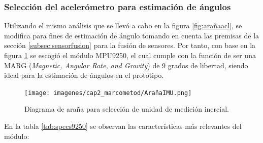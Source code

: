 \subsubsection{Selección del acelerómetro para estimación de ángulos}

Utilizando el mismo análisis que se llevó a cabo en la figura \ref{fig:arañaacl}, se modifica para fines de estimación de ángulo tomando en cuenta las premisas de la sección \ref{subsec:sensorfusion} para la fusión de sensores. Por tanto, con base en la figura \ref{fig:arañaimu} se escogió el módulo MPU9250, el cual cumple con la función de ser una MARG (\textit{Magnetic, Angular Rate, and Gravity}) de 9 grados de libertad, siendo ideal para la estimación de ángulos en el prototipo.

\begin{figure}[H]
    \centering
    \texttt{[image: imagenes/cap2\_marcometod/ArañaIMU.png]}
    \caption{Diagrama de araña para selección de unidad de medición inercial.}
    \label{fig:arañaimu}
\end{figure}


En la tabla \ref{tab:specs9250} se observan las características más relevantes del módulo:

\begin{table}[H]
    \centering
    \caption{Especificaciones del MPU9250 de Invensense.}
    \label{tab:specs9250}
    \end{table}

